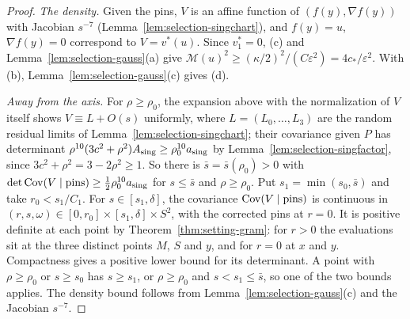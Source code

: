 \begin{proof}
\emph{The density.} Given the pins, $V$ is an affine function of $(f(y),\nabla f(y))$ with Jacobian $s^{-7}$ (Lemma~\ref{lem:selection-singchart}), and $f(y)=u$, $\nabla f(y)=0$ correspond to $V=v^*(u)$. Since $v^*_1=0$, (c) and Lemma~\ref{lem:selection-gauss}(a) give $\mathcal M(u)^2\ge(\kappa/2)^2/(C\varepsilon^2)=4c_*/\varepsilon^2$. With (b), Lemma~\ref{lem:selection-gauss}(c) gives (d).

\emph{Away from the axis.} For $\rho\ge\rho_0$, the expansion above with the normalization of $V$ itself shows $V\equiv L+O(s)$ uniformly, where $L=(L_0,\dots,L_3)$ are the random residual limits of Lemma~\ref{lem:selection-singchart}; their covariance given $P$ has determinant $\rho^{10}(3c^2+\rho^2)A_{\rm sing}\ge\rho_0^{10}a_{\rm sing}$ by Lemma~\ref{lem:selection-singfactor}, since $3c^2+\rho^2=3-2\rho^2\ge1$. So there is $\bar s=\bar s(\rho_0)>0$ with $\det\operatorname{Cov}(V\mid\text{pins})\ge\frac12\rho_0^{10}a_{\rm sing}$ for $s\le\bar s$ and $\rho\ge\rho_0$. Put $s_1=\min(s_0,\bar s)$ and take $r_0<s_1/C_1$. For $s\in[s_1,\delta]$, the covariance $\operatorname{Cov}(V\mid\text{pins})$ is continuous in $(r,s,\omega)\in[0,r_0]\times[s_1,\delta]\times S^2$, with the corrected pins at $r=0$. It is positive definite at each point by Theorem~\ref{thm:setting-gram}: for $r>0$ the evaluations sit at the three distinct points $M$, $S$ and $y$, and for $r=0$ at $x$ and $y$. Compactness gives a positive lower bound for its determinant. A point with $\rho\ge\rho_0$ or $s\ge s_0$ has $s\ge s_1$, or $\rho\ge\rho_0$ and $s<s_1\le\bar s$, so one of the two bounds applies. The density bound follows from Lemma~\ref{lem:selection-gauss}(c) and the Jacobian $s^{-7}$.
\end{proof}

